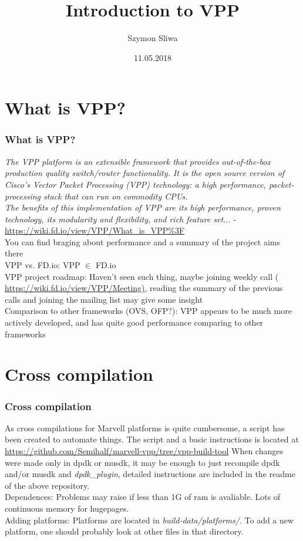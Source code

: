 \documentclass{beamer}
\title{Introduction to VPP}
\author{Szymon Sliwa}
\date{11.05.2018}
\begin{document}
\frame{\titlepage}

  \begin{frame}
  \tableofcontents
  \end{frame}

\section{What is VPP?}
  \begin{frame}
  \frametitle{What is VPP?}
  \textit{The VPP platform is an extensible framework that provides out-of-the-box production quality switch/router functionality. It is the open source version of Cisco's Vector Packet Processing (VPP) technology: a high performance, packet-processing stack that can run on commodity CPUs. \\
The benefits of this implementation of VPP are its high performance, proven technology, its modularity and flexibility, and rich feature set...} - \url{https://wiki.fd.io/view/VPP/What_is_VPP\%3F} \\
  \vfill
You can find braging about performance and a summary of the project aims there \\
  {\tiny \color{blue} VPP vs. FD.io:} {\tiny \color{red} VPP $\in$ FD.io} \\
  {\tiny \color{blue} VPP project roadmap:} {\tiny \color{red} Haven't seen such thing, maybe joining weekly call ({\color{purple} \url{https://wiki.fd.io/view/VPP/Meeting)}}, reading the summary of the previous calls and joining the mailing list may give some insight} \\
  {\tiny \color{blue} Comparison to other frameworks (OVS, OFP?):}
           {\tiny \color{red} VPP appears to be much more actively developed,
           and has quite good performance comparing to other frameworks}

  \end{frame}

\section{Cross compilation}
  \begin{frame}
  \frametitle{Cross compilation}
  As cross compilations for Marvell platforms is quite cumbersome, a script has been 
  created to automate things. The script and a basic instructions is located at
  {\tiny\url{https://github.com/Semihalf/marvell-vpp/tree/vpp-build-tool}}
  \vfill
    When changes were made only in dpdk or musdk, it may be enough to just
  recompile dpdk and/or musdk and \textit{dpdk\_plugin}, detailed instructions are included in the readme
  of the above repository. \\
  {\tiny \color{blue} Dependences:} {\tiny \color{red} Problems may raise if less than 1G of ram is avaliable. Lots of continuous memory for hugepages.} \\
  {\tiny \color{blue} Adding platforms:} {\tiny \color{red} Platforms are located in \textit{build-data/platforms/}.
  To add a new platform, one should probably look at other files in that directory.} \\
  \end{frame}
\end{document}
